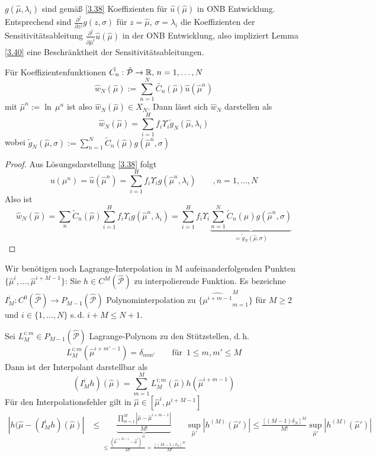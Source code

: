 \begin{bem}
$g(\hat{\mu}, \lambda_i)$ sind gemäß \ref{3.38} Koeffizienten für $\hat{u}(\hat{\mu})$ in ONB Entwicklung. Entsprechend sind $\frac{\partial^j}{\partial z^j} g(z,\sigma)$ für $z=\hat{\mu}, \, \sigma = \lambda_i$ die Koeffizienten der Sensitivitätsableitung $\frac{\partial^j}{\partial \hat{\mu}^j} \hat{u}(\hat{\mu})$ in der ONB Entwicklung, also impliziert Lemma \ref{3.40} eine Beschränktheit der Sensitivitätsableitungen.
\end{bem}

\begin{lemma}
\label{3.41}
Für Koeffizientenfunktionen $\tilde{C_n}: \hat{\mathcal{P}} \rightarrow \mathbb{R}, \, n=1,\dots,N$
\[
	\hat{w}_N(\hat{\mu}):= \sum\limits_{n=1}^N \tilde{C_n} (\hat{\mu})\hat{u}(\hat{\mu}^n)
\]
mit $\hat{\mu}^n := \ln\, \mu^n$ ist also $\hat{w}_N(\hat{\mu}) \in X_N$. Dann lässt sich $\hat{w}_N$ darstellen als
\[
	\hat{w}_N(\hat{\mu}) = \sum\limits_{i=1}^H f_i \Upsilon_i \tilde{g}_N(\hat{\mu},\lambda_i)
\]
wobei $\tilde{g}_N(\hat{\mu}, \sigma) := \sum\limits_{n=1}^N \tilde{C}_n(\hat{\mu}) g(\hat{\mu}^n,\sigma)$
\begin{proof}
	Aus Lösungsdarstellung \ref{3.38} folgt
	\[
		u(\mu^n) = \hat{u}(\hat{\mu}^n) = \sum\limits_{i=1}^H f_i \Upsilon_i  g(\hat{\mu}^n,\lambda_i) \qquad ,n=1,\dots,N
	\]
	Also ist
	\[
		\hat{w}_N(\hat{\mu}) = \sum_n \tilde{C}_n(\hat{\mu})\sum\limits_{i=1}^H f_i \Upsilon_i  g(\hat{\mu}^n,\lambda_i) = \sum\limits_{i=1}^H f_i \Upsilon_i  \underbrace{\sum\limits_{n=1}^N \tilde{C}_n(\hat{\mu}) g(\hat{\mu}^n,\sigma)}_{= \tilde{g}_N(\hat{\mu},\sigma)}
	\]
\end{proof}
\end{lemma}

Wir benötigen noch Lagrange-Interpolation in M aufeinanderfolgenden Punkten $\{\hat{\mu}^i,\dots,\hat{\mu}^{i+M-1}\}$: Sie $h \in C^M(\hat{\mathcal{P}})$ zu interpolierende Funktion. Es bezeichne $I_M^i : C^0 (\hat{\mathcal{P}}) \rightarrow P_{M-1}(\hat{\mathcal{P}})$ Polynominterpolation zu $\{\hat{\mu^{i+m-1}}_{m=1}^M\}$ für $M \geq 2$ und $i \in \{1,\dots,N\}$ s.\,d. $i+M \leq N+1$.

Sei $L_M^{i;m} \in P_{M-1}(\hat{\mathcal{P}})$ Lagrange-Polynom zu den Stützstellen, d.\,h.
\[
	L_M^{i;m}(\hat{\mu}^{i+m'-1}) = \delta_{m m'} \qquad \text{für} \,\,\, 1 \leq m, m' \leq M
\]
Dann ist der Interpolant darstellbar als
\[
	(I_M^i h)(\hat{\mu}) = \sum\limits_{m=1}^M L_M^{i;m}(\hat{\mu})h(\hat{\mu}^{i+m-1})
\]
Für den Interpolationsfehler gilt in $\hat{\mu} \in [\hat{\mu}^i, \mu^{i+M-1}]$
\begin{align}
	|h(\hat{\mu} - (I_M^i h)(\hat{\mu})| &\leq \underbrace{\frac{\prod\limits_{m=1}^M |\hat{\mu}-\hat{\mu}^{i+m-1}|}{M!}}_{\leq \frac{(\hat{\mu}^{i+M-1} - \hat{\mu}^i)^M}{M!} = \frac{[(M-1)\delta_N]^M}{M!}} \sup_{\hat{\mu}'} |h^{(M)}(\hat{\mu}')| \leq \frac{[(M-1)\delta_N]^M}{M!}  \sup_{\hat{\mu}'} |h^{(M)}(\hat{\mu}')|
	\label{eq:3.18}
\end{align}

